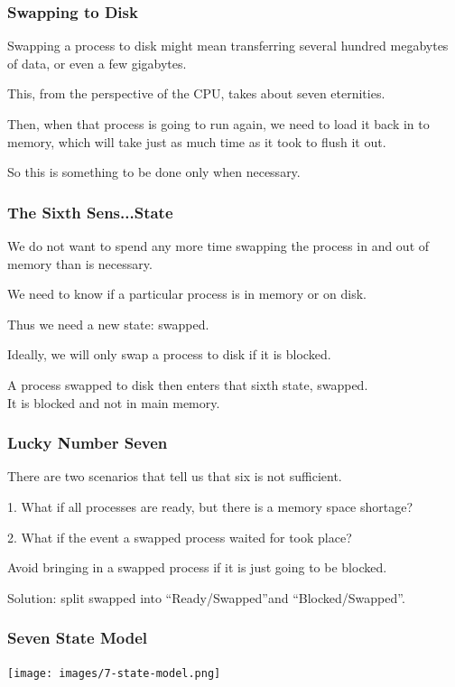 \begin{frame}
\frametitle{Swapping to Disk}

Swapping a process to disk might mean transferring several hundred megabytes of data, or even a few gigabytes. 

This, from the perspective of the CPU, takes about seven eternities. 

Then, when that process is going to run again, we need to load it back in to memory, which will take just as much time as it took to flush it out. 

So this is something to be done only when necessary.

\end{frame}

\begin{frame}
\frametitle{The Sixth Sens...State}

We do not want to spend any more time swapping the process in and out of memory than is necessary.

 We need to know if a particular process is in memory or on disk.
 
Thus we need a new state: swapped.  

Ideally, we will only swap a process to disk if it is blocked. 

A process swapped to disk then enters that sixth state, swapped.\\
\quad It is blocked and not in main memory.

\end{frame}

\begin{frame}
\frametitle{Lucky Number Seven}

There are two scenarios that tell us that six is not sufficient.

1. What if all processes are ready, but there is a memory space shortage?

2. What if the event a swapped process waited for took place?

Avoid bringing in a swapped process if it is just going to be blocked.

Solution: split swapped into ``Ready/Swapped''and ``Blocked/Swapped''.

\end{frame}

\begin{frame}
\frametitle{Seven State Model}

\begin{center}
\texttt{[image: images/7-state-model.png]}
\end{center}

\end{frame}

